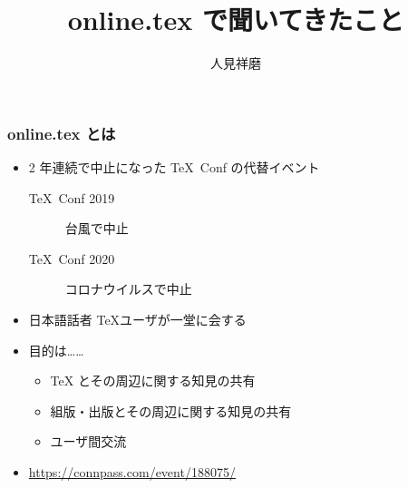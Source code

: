 \documentclass[aspectratio=149]{beamer}
\author{人見祥磨}
\title{online.tex で聞いてきたこと}
\begin{document}
\begin{frame}
	\maketitle
\end{frame}

\begin{frame}
	\frametitle{online.tex とは}
	\begin{itemize}
		\item 2 年連続で中止になった \TeX\ Conf の代替イベント
			\begin{description}
				\item[\TeX\ Conf 2019] 台風で中止
				\item[\TeX\ Conf 2020] コロナウイルスで中止
			\end{description}
		\item 日本語話者 \TeX ユーザが一堂に会する
		\item 目的は……
			\begin{itemize}
				\item TeX とその周辺に関する知見の共有
				\item 組版・出版とその周辺に関する知見の共有
				\item ユーザ間交流
			\end{itemize}
		\item \url{https://connpass.com/event/188075/}
	\end{itemize}
\end{frame}
\end{document}
